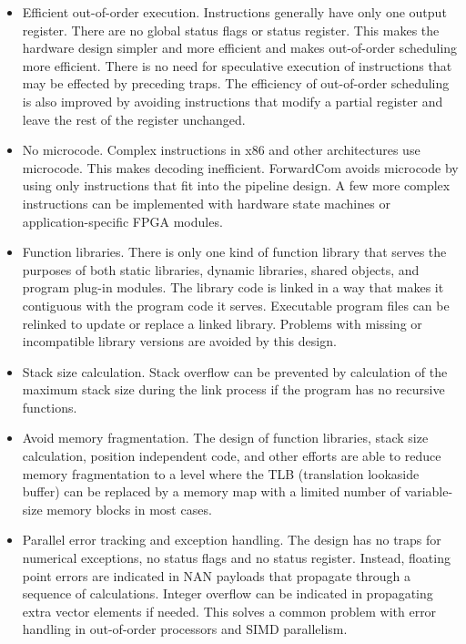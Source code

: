 \documentclass[forwardcom.tex]{subfiles}
\begin{document}
\begin{itemize}
\item Efficient out-of-order execution. Instructions generally have only one output register. There are no global status flags or status register. This makes the hardware design simpler and more efficient and makes out-of-order scheduling more efficient. There is no need for speculative execution of instructions that may be effected by preceding traps. The efficiency of out-of-order scheduling is also improved by avoiding instructions that modify a partial register and leave the rest of the register unchanged.

\item No microcode. Complex instructions in x86 and other architectures use microcode. This makes decoding inefficient. ForwardCom avoids microcode by using only instructions that fit into the pipeline design. A few more complex instructions can be implemented with hardware state machines or application-specific FPGA modules.

\item Function libraries. There is only one kind of function library that serves the purposes of both static libraries, dynamic libraries, shared objects, and program plug-in modules. The library code is linked in a way that makes it contiguous with the program code it serves. Executable program files can be relinked to update or replace a linked library. Problems with missing or incompatible library versions are avoided by this design.

\item Stack size calculation. Stack overflow can be prevented by calculation of the maximum stack size during the link process if the program has no recursive functions.

\item Avoid memory fragmentation. The design of function libraries, stack size calculation, position independent code, and other efforts are able to reduce memory fragmentation to a level where the TLB (translation lookaside buffer) can be replaced by a memory map with a limited number of variable-size memory blocks in most cases.

\item Parallel error tracking and exception handling. The design has no traps for numerical exceptions, no status flags and no status register. Instead, floating point errors are indicated in NAN payloads that propagate through a sequence of calculations. Integer overflow can be indicated in propagating extra vector elements if needed. This solves a common problem with error handling in out-of-order processors and SIMD parallelism.


\end{itemize}
\end{document}
